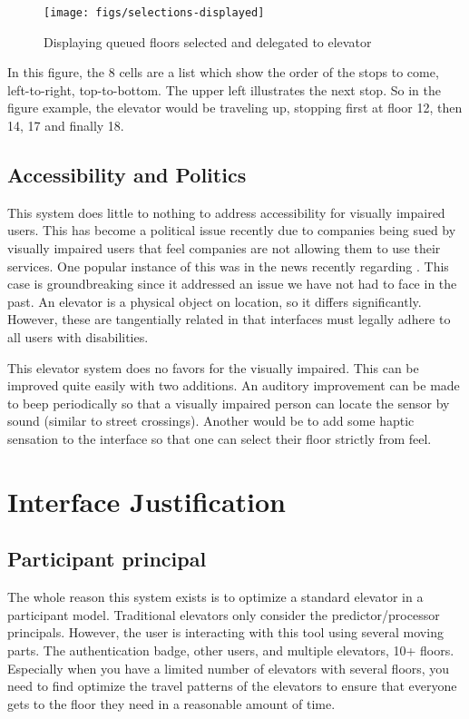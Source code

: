 \begin{figure}[H]
  \centering
  \texttt{[image: figs/selections-displayed]}
  \caption{Displaying queued floors selected and delegated to elevator}
  \label{fig::1}
\end{figure}

In this figure, the 8 cells are a list which show the order of the stops to come, left-to-right, top-to-bottom. The upper left illustrates the next stop. So in the figure example, the elevator would be traveling up, stopping first at floor 12, then 14, 17 and finally 18.

\subsection{Accessibility and Politics}
This system does little to nothing to address accessibility for visually impaired users. This has become a political issue recently due to companies being sued by visually impaired users that feel companies are not allowing them to use their services. One popular instance of this was in the news recently regarding . This case is groundbreaking since it addressed an issue we have not had to face in the past. An elevator is a physical object on location, so it differs significantly. However, these are tangentially related in that interfaces must legally adhere to all users with disabilities.

This elevator system does no favors for the visually impaired. This can be improved quite easily with two additions. An auditory improvement can be made to beep periodically so that a visually impaired person can locate the sensor by sound (similar to street crossings). Another would be to add some haptic sensation to the interface so that one can select their floor strictly from feel.

\section{Interface Justification}

\subsection{Participant principal}
The whole reason this system exists is to optimize a standard elevator in a participant model. Traditional elevators only consider the predictor/processor principals. However, the user is interacting with this tool using several moving parts. The authentication badge, other users, and multiple elevators, 10+ floors. Especially when you have a limited number of elevators with several floors, you need to find optimize the travel patterns of the elevators to ensure that everyone gets to the floor they need in a reasonable amount of time.

